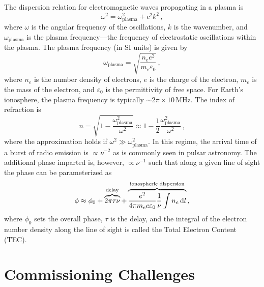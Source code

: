 \begin{bibunit}
The dispersion relation for electromagnetic waves propagating in a plasma is
\begin{equation}
    \omega^2 = \omega_\text{plasma}^2 + c^2 k^2\,,
\end{equation}
where $\omega$ is the angular frequency of the oscillations, $k$ is the wavenumber, and
$\omega_\text{plasma}$ is the plasma frequency---the frequency of electrostatic oscillations within
the plasma. The plasma frequency (in SI units) is given by
\begin{equation}
    \omega_\text{plasma} = \sqrt{\frac{n_e e^2}{m_e \varepsilon_0}}\,,
\end{equation}
where $n_e$ is the number density of electrons, $e$ is the charge of the electron, $m_e$ is the mass
of the electron, and $\varepsilon_0$ is the permittivity of free space.  For Earth's ionosphere, the
plasma frequency is typically $\sim 2\pi \times 10\,\text{MHz}$.  The index of refraction is
\begin{equation}
    n = \sqrt{1 - \frac{\omega_\text{plasma}^2}{\omega^2}}
      \approx 1 - \frac{1}{2}\frac{\omega_\text{plasma}^2}{\omega^2}\,,
\end{equation}
where the approximation holds if $\omega^2 \gg \omega_\text{plasma}^2$. In this regime, the arrival
time of a burst of radio emission is $\propto \nu^{-2}$ as is commonly seen in pulsar astronomy.
The additional phase imparted is, however, $\propto \nu^{-1}$ such that along a given line of sight
the phase can be parameterized as
\begin{equation}
    \phi \approx \phi_0 + \overbrace{2\pi\tau\nu}^\text{delay}
    + \overbrace{\frac{e^2}{4\pi m_e c \varepsilon_0}
        \frac{1}{\nu}\int n_e\,{\textrm d} l}^\text{ionospheric dispersion}\,,
\end{equation}
where $\phi_0$ sets the overall phase, $\tau$ is the delay, and the integral of the electron number
density along the line of sight is called the Total Electron Content (TEC).

\citep{2011ITAP...59.1855E}













\section{Commissioning Challenges}
\label{sec:commissioning-challenges}


\end{bibunit}
